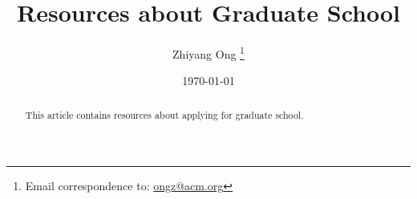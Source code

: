 \documentclass[a4paper,10pt]{article}
\begin{document}
\title{Resources about Graduate School}
\date{\today}
\author{Zhiyang Ong
\thanks{Email correspondence to: \href{mailto:ongz@acm.org}{ongz@acm.org}}
}
\maketitle

\begin{abstract} 
This article contains resources about applying for graduate school.
\end{abstract}


\tableofcontents





{\linespread{1}
%

%
%

}

\end{document}
